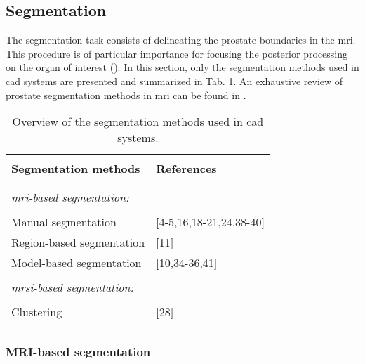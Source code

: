 

\subsection{Segmentation} \label{subsec:segmentation}

The segmentation task consists of delineating the prostate boundaries in the \ac{mri}. This procedure is of particular importance for focusing the posterior processing on the organ of interest (\cite{Ghose2012}). In this section, only the segmentation methods used in \ac{cad} systems are presented and summarized in Tab. \ref{tab:seg}. An exhaustive review of prostate segmentation methods in \ac{mri} can be found in \cite{Ghose2012}.

\begin{table}
	\caption{Overview of the segmentation methods used in \ac{cad} systems.}
	\small
	\begin{tabular}{p{.65\linewidth} p{.25\linewidth}}
		\hline \\ [-1.5ex]
		\textbf{Segmentation methods} & \textbf{References} \\ \\ [-1.5ex]
		\hline \\ [-1.5ex]
		\textit{\ac{mri}-based segmentation:} & \\ \\ [-1.5ex]
		\quad Manual segmentation & $[$4-5,16,18-21,24,38-40$]$ \\
		\quad Region-based segmentation & $[$11$]$ \\
		\quad Model-based segmentation & $[$10,34-36,41$]$ \\ \\ [-1.5ex]
		\textit{\ac{mrsi}-based segmentation:} & \\ \\ [-1.5ex]
		\quad Clustering & $[$28$]$ \\ \\ [-1.5ex]
		\hline
	\end{tabular}
	\label{tab:seg}
\end{table}

\subsubsection{MRI-based segmentation}


